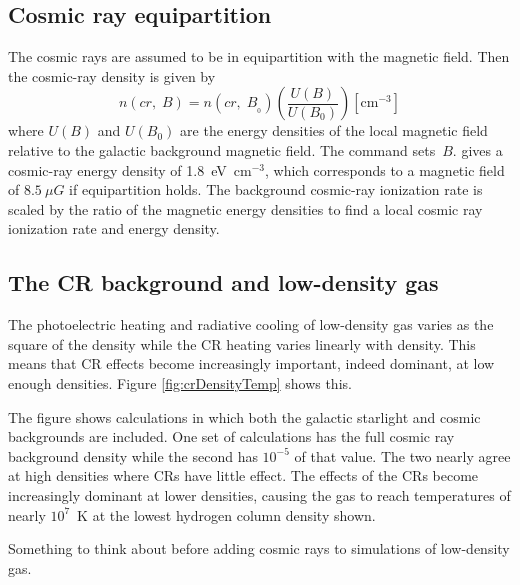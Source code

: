 \subsection{Cosmic ray equipartition}

The cosmic rays are assumed to be in equipartition with the magnetic
field.
Then the cosmic-ray density is given by
\begin{equation}
n\left( {cr,\;B} \right) = n\left( {cr,\;B_{_0 } } \right)\left(
{\frac{{U\left( B \right)}}{{U\left( {B_0 } \right)}}} \right)
[\mathrm{cm}^{-3}]%
\end{equation}
where $U(B)$ and $U(B_0)$ are the energy densities of the local
magnetic field
relative to the galactic background magnetic field.
The 
command sets~$B$.  \citet{Webber1998} gives a cosmic-ray
energy density of 1.8~eV~cm$^{-3}$,
which corresponds to a magnetic field of
$8.5~\mu G$ if equipartition holds.
The background cosmic-ray ionization rate
is scaled by the ratio of the magnetic energy densities to find a local
cosmic ray ionization rate and energy density.

\subsection{The CR background and low-density gas}

The photoelectric heating and radiative cooling of low-density gas varies as the
square of the density while the CR heating varies linearly with density.
This means that CR effects become increasingly important, indeed dominant,
at low enough densities.
Figure \ref{fig:crDensityTemp} shows this.

The figure shows calculations in which both the galactic starlight and cosmic backgrounds 
are included.  
One set of calculations has the full cosmic ray background density while the second
has $10^{-5}$ of that value.  
The two nearly agree at high densities where CRs have little effect.
The effects of the CRs become increasingly dominant at lower densities, causing
the gas to reach temperatures of nearly $10^7$~K at the lowest hydrogen column density shown.

Something to think about before adding cosmic rays to simulations of low-density gas.

